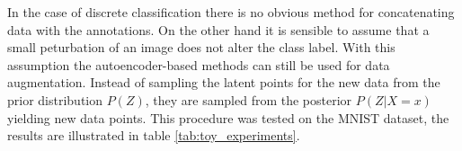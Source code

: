 In the case of discrete classification there is no obvious method for concatenating data with the annotations. On the other hand it is sensible to assume that a small peturbation of an image does not alter the class label. With this assumption the autoencoder-based methods can still be used for data augmentation. Instead of sampling the latent points for the new data from the prior distribution $P(Z)$, they are sampled from the posterior $P(Z|X=x)$ yielding new data points. This procedure was tested on the MNIST dataset, the results are illustrated in table \ref{tab:toy_experiments}.










